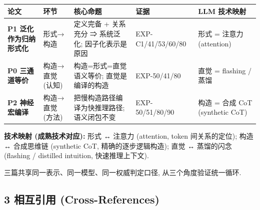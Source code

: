 \documentclass[
]{article}
\begin{document}
\begin{longtable}[]{@{}
  >{\raggedright\arraybackslash}p{}
  >{\raggedright\arraybackslash}p{}
  >{\raggedright\arraybackslash}p{}
  >{\raggedright\arraybackslash}p{}
  >{\raggedright\arraybackslash}p{}@{}}
\toprule\noalign{}
\begin{minipage}[b]{\linewidth}\raggedright
论文
\end{minipage} & \begin{minipage}[b]{\linewidth}\raggedright
环节
\end{minipage} & \begin{minipage}[b]{\linewidth}\raggedright
核心命题
\end{minipage} & \begin{minipage}[b]{\linewidth}\raggedright
证据
\end{minipage} & \begin{minipage}[b]{\linewidth}\raggedright
LLM 技术映射
\end{minipage} \\
\midrule\noalign{}
\endhead
\bottomrule\noalign{}
\endlastfoot
\textbf{P1 泛化作为归纳形式化} & 形式→构造 & 定义完备 + 关系充分 ⇒
系统泛化; 因子化表示是原因 & EXP-C1/41/53/60/80 & 形式 = 注意力
(attention) \\
\textbf{P0 三通道等价} & 构造→直觉 (认知) & 构造=形式=直觉 语义等价;
直觉是编译的构造 & EXP-50/41/80 & 直觉 = flashing / 蒸馏 \\
\textbf{P2 神经宏编译} & 构造→直觉 (方法) &
把慢构造路径编译为快推理路径; 语义闭包不变 & EXP-50/51/80/90 & 构造 =
合成 CoT (synthetic CoT) \\
\end{longtable}

\textbf{技术映射 (成熟技术对应):} 形式 ↔ 注意力 (attention, token
间关系的定位); 构造 ↔ 合成思维链 (synthetic CoT, 精确的逐步逻辑构造);
直觉 ↔ 蒸馏的闪念 (flashing / distilled intuition, 快速推理上下文).

三篇共享同一表示、同一模型、同一权威判定口径, 从三个角度验证统一循环.

\subsection{3 相互引用
(Cross-References)}\label{ux76f8ux4e92ux5f15ux7528-cross-references}
\end{document}
